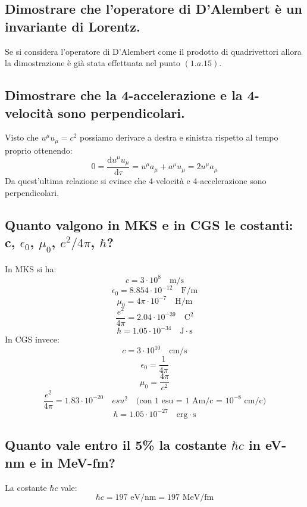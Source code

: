 \subsection[]{ Dimostrare che l'operatore di D'Alembert è un invariante di Lorentz.} 
Se si considera l'operatore di D'Alembert come il prodotto di quadrivettori allora la dimostrazione è già stata effettuata nel punto $(1.a.15)$.
\subsection[]{ Dimostrare che la 4-accelerazione e la 4-velocità sono perpendicolari.} 
Visto che $u^{\mu}u_{\mu} = c^{2}$ possiamo derivare a destra e sinistra rispetto al tempo proprio ottenendo:
\[
	0 = \frac{\mbox{d} u^{\mu}u_{\mu}}{\mbox{d} \tau} = u^{\mu}a_{\mu} + a^{\mu}u_{\mu} = 2 u^{\mu}a_{\mu}
\] 
Da quest'ultima relazione si evince che 4-velocità e 4-accelerazione sono perpendicolari.
\subsection[]{ Quanto valgono in MKS e in CGS le costanti: c, $\epsilon_0$,  $\mu_0$, $e^2/4\pi$,  $\hbar$?} 
In MKS si ha:
\[
	c = 3 \cdot 10^{8} \quad \text{m/s}
\] 
\[
	\epsilon_0 = 8.854 \cdot 10^{-12} \quad \text{F/m}
\]
\[
	\mu_0 = 4\pi \cdot 10^{-7} \quad \text{H/m}
\] 
\[
	\frac{e^{2}}{4\pi} = 2.04 \cdot 10^{-39} \quad \text{C}^{2}
\] 
\[
	\hbar = 1.05 \cdot 10^{-34} \quad \text{J} \cdot \text{s}
\] 
In CGS invece:
\[
	c = 3 \cdot 10^{10} \quad \text{cm/s}
\] 
\[
	\epsilon_0 = \frac{1}{4\pi}
\]
\[
	\mu_0 = \frac{4\pi}{c^{2}} 
\] 
\[
	\frac{e^{2}}{4\pi} = 1.83 \cdot 10^{-20} \quad esu^{2} \quad \text{(con 1 esu = 1 Am/c = $10^{-8}$ cm/c)} 
\] 
\[
	\hbar = 1.05 \cdot 10^{-27} \quad \text{erg} \cdot \text{s}
\]

\subsection[]{ Quanto vale entro il 5\% la costante $\hbar c$ in eV-nm e in MeV-fm?}
La costante $\hbar c$ vale:
\[
	\hbar c = 197 \text{ eV/nm} = 197 \text{ MeV/fm}
\]  

